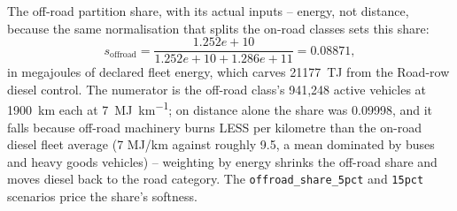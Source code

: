 The off-road partition share, with its actual inputs -- energy, not
distance, because the same normalisation that splits the on-road classes
sets this share:
\begin{equation*}
s_{\text{offroad}} = \frac{1.252e+10}{1.252e+10 + 1.286e+11} = 0.08871,
\end{equation*}
in megajoules of declared fleet energy, which carves \SI{21177}{\tera\joule} from the Road-row diesel control. The numerator is the off-road class's 941,248 active vehicles at \SI{1900}{\kilo\metre} each at \SI{7}{\mega\joule\per\kilo\metre}; on distance alone the share was 0.09998, and it falls because off-road machinery burns LESS per kilometre than the on-road diesel fleet average (7 MJ/km against roughly 9.5, a mean dominated by buses and heavy goods vehicles) -- weighting by energy shrinks the off-road share and moves diesel back to the road category. The \texttt{offroad\_share\_5pct} and \texttt{15pct} scenarios price the share's softness.
